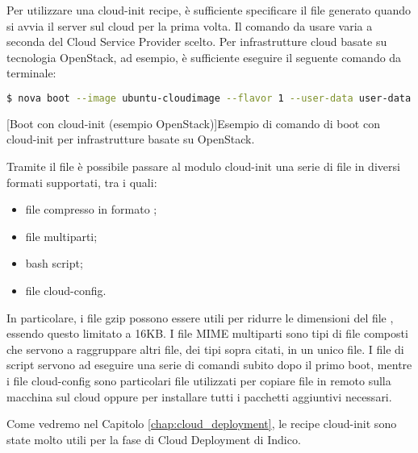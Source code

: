             Per utilizzare una cloud-init recipe, è sufficiente specificare il file  generato quando si avvia il server sul cloud per la prima volta. Il comando da usare varia a seconda del Cloud Service Provider scelto. Per infrastrutture cloud basate su tecnologia OpenStack, ad esempio, è sufficiente eseguire il seguente comando da terminale:
            
            \begin{center}
                \begin{lstlisting}[language=bash, gobble=18]
                    $ nova boot --image ubuntu-cloudimage --flavor 1 --user-data user-data
                \end{lstlisting}
                \captionsetup{textformat=empty,labelformat=empty} \vspace{-2em}
                [Boot con cloud-init (esempio OpenStack)]{Esempio di comando di boot con cloud-init per infrastrutture basate su OpenStack.}
            \end{center}
            
            Tramite il file  è possibile passare al modulo cloud-init una serie di file in diversi formati supportati, tra i quali:
            
            \begin{itemize}
                \item file compresso in formato ;
                \item file  multiparti;
                \item bash script;
                \item file cloud-config.
            \end{itemize}
            
            In particolare, i file gzip possono essere utili per ridurre le dimensioni del file , essendo questo limitato a 16KB. I file \ac{MIME} multiparti sono tipi di file composti che servono a raggruppare altri file, dei tipi sopra citati, in un unico file. I file di script servono ad eseguire una serie di comandi subito dopo il primo boot, mentre i file cloud-config sono particolari file utilizzati per copiare file in remoto sulla macchina sul cloud oppure per installare tutti i pacchetti aggiuntivi necessari.
            
            Come vedremo nel Capitolo \ref{chap:cloud_deployment}, le recipe cloud-init sono state molto utili per la fase di Cloud Deployment di Indico.
                    
